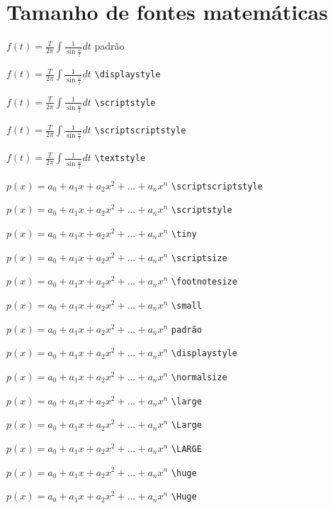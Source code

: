 \documentclass[a4paper]{article}
\newcommand{\funcaoint}{
  f(t) = \frac{T}{2\pi} \int{\frac{1}{\sin\frac{\omega}{t}}}dt
}
\newcommand{\pol}{
  p(x) = a_0 + a_1 x + a_2 x^2 + \ldots + a_n x^n
}
\begin{document}
\section*{Tamanho de fontes matemáticas}

$\funcaoint$ \hfill padrão

$\displaystyle\funcaoint$ \hfill \verb|\displaystyle|

$\scriptstyle\funcaoint$ \hfill \verb|\scriptstyle|

$\scriptscriptstyle\funcaoint$ \hfill \verb|\scriptscriptstyle|

$\textstyle\funcaoint$ \hfill \verb|\textstyle|

$\scriptscriptstyle \pol$ \hfill \verb|\scriptscriptstyle|

$\scriptstyle \pol$ \hfill \verb|\scriptstyle|

{\tiny $\pol$} \hfill \verb|\tiny|

{\scriptsize $\pol$} \hfill \verb|\scriptsize|

{\footnotesize $\pol$} \hfill \verb|\footnotesize|

{\small $\pol$} \hfill \verb|\small|

$\pol$ \hfill \verb|padrão|

$\displaystyle \pol$ \hfill \verb|\displaystyle|

{\normalsize $\pol$} \hfill \verb|\normalsize|

{\large $\pol$} \hfill \verb|\large|

{\Large $\pol$} \hfill \verb|\Large|

{\LARGE $\pol$} \hfill \verb|\LARGE|

{\huge $\pol$} \hfill \verb|\huge|

{\Huge $\pol$} \hfill \verb|\Huge|
\end{document}
